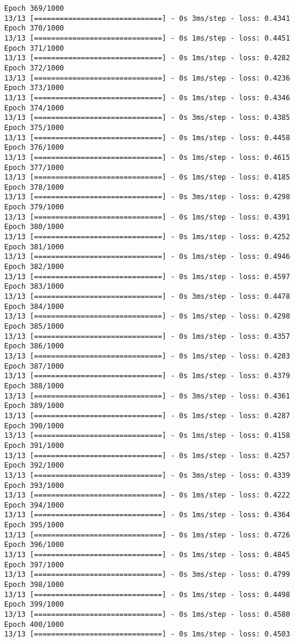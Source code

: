 \documentclass[11pt]{article}
\begin{document}
\begin{Verbatim}[commandchars=\\\{\}]
Epoch 369/1000
13/13 [==============================] - 0s 3ms/step - loss: 0.4341
Epoch 370/1000
13/13 [==============================] - 0s 1ms/step - loss: 0.4451
Epoch 371/1000
13/13 [==============================] - 0s 1ms/step - loss: 0.4282
Epoch 372/1000
13/13 [==============================] - 0s 1ms/step - loss: 0.4236
Epoch 373/1000
13/13 [==============================] - 0s 1ms/step - loss: 0.4346
Epoch 374/1000
13/13 [==============================] - 0s 3ms/step - loss: 0.4385
Epoch 375/1000
13/13 [==============================] - 0s 1ms/step - loss: 0.4458
Epoch 376/1000
13/13 [==============================] - 0s 1ms/step - loss: 0.4615
Epoch 377/1000
13/13 [==============================] - 0s 1ms/step - loss: 0.4185
Epoch 378/1000
13/13 [==============================] - 0s 3ms/step - loss: 0.4298
Epoch 379/1000
13/13 [==============================] - 0s 1ms/step - loss: 0.4391
Epoch 380/1000
13/13 [==============================] - 0s 1ms/step - loss: 0.4252
Epoch 381/1000
13/13 [==============================] - 0s 1ms/step - loss: 0.4946
Epoch 382/1000
13/13 [==============================] - 0s 1ms/step - loss: 0.4597
Epoch 383/1000
13/13 [==============================] - 0s 3ms/step - loss: 0.4478
Epoch 384/1000
13/13 [==============================] - 0s 1ms/step - loss: 0.4298
Epoch 385/1000
13/13 [==============================] - 0s 1ms/step - loss: 0.4357
Epoch 386/1000
13/13 [==============================] - 0s 1ms/step - loss: 0.4203
Epoch 387/1000
13/13 [==============================] - 0s 1ms/step - loss: 0.4379
Epoch 388/1000
13/13 [==============================] - 0s 3ms/step - loss: 0.4361
Epoch 389/1000
13/13 [==============================] - 0s 1ms/step - loss: 0.4287
Epoch 390/1000
13/13 [==============================] - 0s 1ms/step - loss: 0.4158
Epoch 391/1000
13/13 [==============================] - 0s 1ms/step - loss: 0.4257
Epoch 392/1000
13/13 [==============================] - 0s 3ms/step - loss: 0.4339
Epoch 393/1000
13/13 [==============================] - 0s 1ms/step - loss: 0.4222
Epoch 394/1000
13/13 [==============================] - 0s 1ms/step - loss: 0.4364
Epoch 395/1000
13/13 [==============================] - 0s 1ms/step - loss: 0.4726
Epoch 396/1000
13/13 [==============================] - 0s 1ms/step - loss: 0.4845
Epoch 397/1000
13/13 [==============================] - 0s 3ms/step - loss: 0.4799
Epoch 398/1000
13/13 [==============================] - 0s 1ms/step - loss: 0.4498
Epoch 399/1000
13/13 [==============================] - 0s 1ms/step - loss: 0.4580
Epoch 400/1000
13/13 [==============================] - 0s 1ms/step - loss: 0.4503

\end{Verbatim}
\end{document}

